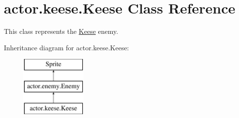 \hypertarget{classactor_1_1keese_1_1_keese}{}\section{actor.\+keese.\+Keese Class Reference}
\label{classactor_1_1keese_1_1_keese}


This class represents the \hyperlink{classactor_1_1keese_1_1_keese}{Keese} enemy.  


Inheritance diagram for actor.\+keese.\+Keese\+:\begin{figure}[H]
\begin{center}
\leavevmode
\includegraphics[height=3.000000cm]{classactor_1_1keese_1_1_keese}
\end{center}
\end{figure}
